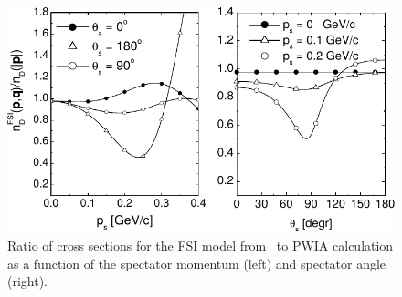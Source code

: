 \begin{figure}
   \centering
   \includegraphics{figures/FSI_quasielastic_Atti_2003.pdf}
   \caption{\label{fig:deuteronFSI} Ratio of cross sections for the FSI model 
   from~\cite{CiofidegliAtti:2003pb} to PWIA calculation as a function of
   the spectator momentum (left) and spectator angle (right).}
\end{figure}




